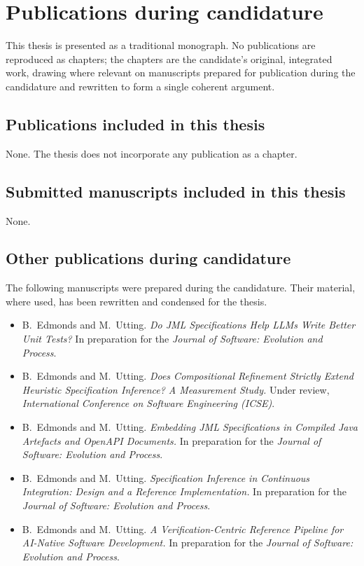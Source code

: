 \chapter*{Publications during candidature}

This thesis is presented as a traditional monograph. No publications are
reproduced as chapters; the chapters are the candidate's original, integrated
work, drawing where relevant on manuscripts prepared for publication during the
candidature and rewritten to form a single coherent argument.

\section*{Publications included in this thesis}

None. The thesis does not incorporate any publication as a chapter.

\section*{Submitted manuscripts included in this thesis}

None.

\section*{Other publications during candidature}

The following manuscripts were prepared during the candidature. Their material,
where used, has been rewritten and condensed for the thesis.

\begin{itemize}
  \item B.~Edmonds and M.~Utting. \emph{Do JML Specifications Help LLMs Write
        Better Unit Tests?} In preparation for the \emph{Journal of Software:
        Evolution and Process}.
  \item B.~Edmonds and M.~Utting. \emph{Does Compositional Refinement Strictly
        Extend Heuristic Specification Inference? A Measurement Study.} Under
        review, \emph{International Conference on Software Engineering (ICSE)}.
  \item B.~Edmonds and M.~Utting. \emph{Embedding JML Specifications in Compiled
        Java Artefacts and OpenAPI Documents.} In preparation for the
        \emph{Journal of Software: Evolution and Process}.
  \item B.~Edmonds and M.~Utting. \emph{Specification Inference in Continuous
        Integration: Design and a Reference Implementation.} In preparation for
        the \emph{Journal of Software: Evolution and Process}.
  \item B.~Edmonds and M.~Utting. \emph{A Verification-Centric Reference Pipeline
        for AI-Native Software Development.} In preparation for the \emph{Journal
        of Software: Evolution and Process}.
\end{itemize}

